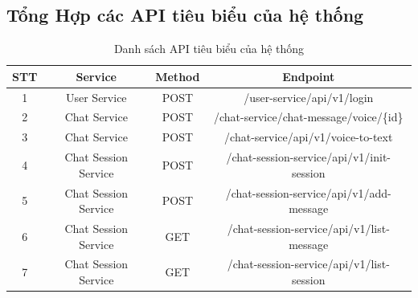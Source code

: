 \documentclass[../DoAn.tex]{subfiles}
\begin{document}
\subsection{Tổng Hợp các API tiêu biểu của hệ thống}
\begin{table}[H]
    \centering
    \renewcommand{\arraystretch}{1.8}
    \begin{tabular}{|c|c|c|c|}
        \hline
        STT & Service              & Method & Endpoint \\
        \hline
        1   & User Service         & POST   &
        /user-service/api/v1/login
        \\
        \hline
        2   & Chat Service         & POST   &
        /chat-service/chat-message/voice/\{id\}
        \\
        \hline
        3   & Chat Service        & POST   &
        /chat-service/api/v1/voice-to-text
        \\
        \hline
        4   & Chat Session Service & POST   &
        /chat-session-service/api/v1/init-session
        \\
        \hline
        5   & Chat Session Service & POST   &
        /chat-session-service/api/v1/add-message
        \\
        \hline
        6   & Chat Session Service & GET    &
        /chat-session-service/api/v1/list-message
        \\
        \hline
        7   & Chat Session Service & GET    &
        /chat-session-service/api/v1/list-session
        \\
        \hline
    \end{tabular}
    \caption{Danh sách API tiêu biểu của hệ thống}

\end{table}
\end{document}
